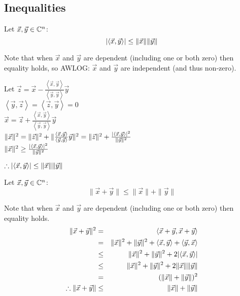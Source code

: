 \documentclass[letterpaper,12pt,fleqn]{article}
\newcommand{\inner}[2]{\left<#1,#2\right>}
\newcommand{\norm}[1]{\|#1\|}
\newcommand{\vx}{\vec{x}}
\newcommand{\vy}{\vec{y}}
\newcommand{\vz}{\vec{z}}
\begin{document}
\newpage

\subsection*{Inequalities}

\begin{theorem}
  Let $\vx,\vy\in\C^n$:
  \[\abs{\inner{\vx}{\vy}}\le\norm{\vx}\norm{\vy}\]
\end{theorem}

\begin{theproof}
  Note that when $\vx$ and $\vy$ are dependent (including one or both zero)
  then equality holds, so AWLOG: $\vx$ and $\vy$ are independent (and thus
  non-zero).

  Let $\vz=\vx-\frac{\inner{\vx}{\vy}}{\inner{\vy}{\vy}}\vy$ \\
  $\inner{\vy}{\vz}=\inner{\vz}{\vy}=0$ \\
  $\vx=\vz+\frac{\inner{\vx}{\vy}}{\inner{\vy}{\vy}}\vy$ \\
  $\norm{\vx}^2=\norm{\vz}^2+
  \norm{\frac{\inner{\vx}{\vy}}{\inner{\vy}{\vy}}\vy}^2=
  \norm{\vz}^2+\frac{\abs{\inner{\vx}{\vy}}^2}{\norm{\vy}^2}$ \\
  $\norm{\vx}^2\ge\frac{\abs{\inner{\vx}{\vy}}^2}{\norm{\vy}^2}$
  
  $\therefore \abs{\inner{\vx}{\vy}}\le\norm{\vx}\norm{\vy}$
\end{theproof}

\begin{theorem}
  Let $\vx,\vy\in\C^n$:
  \[\norm{\vx+\vy}\le\norm{\vx}+\norm{\vy}\]
\end{theorem}

\begin{theproof}
  Note that when $\vx$ and $\vy$ are dependent (including one or both zero)
  then equality holds.
  \begin{eqnarray*}
    \norm{\vx+\vy}^2 &=& \inner{\vx+\vy}{\vx+\vy} \\
    &=& \norm{\vx}^2+\norm{\vy}^2+\inner{\vx}{\vy}+\inner{\vy}{\vx} \\
    &\le& \norm{\vx}^2+\norm{\vy}^2+2\abs{\inner{\vx}{\vy}} \\
    &\le& \norm{\vx}^2+\norm{\vy}^2+2\norm{\vx}\norm{\vy} \\
    &=& (\norm{\vx}+\norm{\vy})^2 \\
    \therefore \norm{\vx+\vy} &\le& \norm{\vx}+\norm{\vy}
  \end{eqnarray*}
\end{theproof}
  
\end{document}
